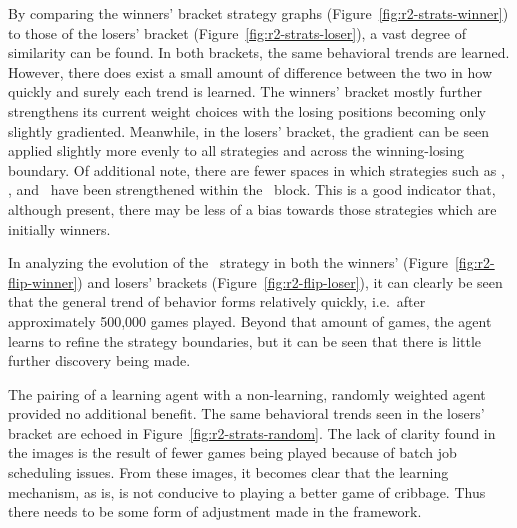 By comparing the winners' bracket strategy graphs
(Figure~\ref{fig:r2-strats-winner})
to those of the losers' bracket
(Figure~\ref{fig:r2-strats-loser}),
a vast degree of similarity can be found.
%
In both brackets,
the same behavioral trends are learned.
%
However,
there does exist a small amount of difference between the two
in how quickly and surely each trend is learned.
%
The winners' bracket mostly further strengthens its current weight choices
with the losing positions becoming only slightly gradiented.
%
Meanwhile,
in the losers' bracket,
the gradient can be seen applied slightly more evenly to all strategies
and
across the winning-losing boundary.
%
Of additional note,
there are fewer spaces in which
strategies such as \cribminavg, \peggingmaxavggained, and \peggingminavggiven\ 
have been strengthened within the \handmaxmin\ block.
%
This is a good indicator that,
although present,
there may be less of a bias towards those strategies which are initially winners.


In analyzing the evolution of the \handmaxavg\ strategy in both the winners'
(Figure~\ref{fig:r2-flip-winner})
and losers' brackets (Figure~\ref{fig:r2-flip-loser}),
it can clearly be seen that the general trend of behavior forms
relatively quickly,
i.e.\  after approximately 500,000 games played.
%
Beyond that amount of games,
the agent learns to refine the strategy boundaries,
but it can be seen that there is little further discovery being made.








The pairing of a learning agent with a non-learning, randomly weighted agent
provided no additional benefit.
%
The same behavioral trends seen in the losers' bracket are echoed
in Figure~\ref{fig:r2-strats-random}.
%
The lack of clarity found in the images is the result of
fewer games being played because of batch job scheduling issues.
%
From these images,
it becomes clear that the learning mechanism,
as is,
is not conducive to playing a better game of cribbage.
%
Thus there needs to be some form of adjustment made in the framework.







